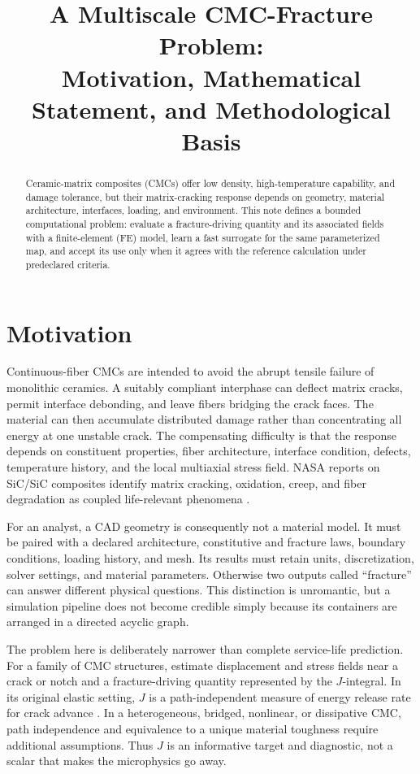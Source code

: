 \documentclass[11pt]{article}
\begin{document}
\title{A Multiscale CMC-Fracture Problem:\\Motivation, Mathematical Statement, and Methodological Basis}
\author{}
\date{}
\maketitle

\begin{abstract}
Ceramic-matrix composites (CMCs) offer low density, high-temperature capability,
and damage tolerance, but their matrix-cracking response depends on geometry,
material architecture, interfaces, loading, and environment. This note defines
a bounded computational problem: evaluate a fracture-driving quantity and its
associated fields with a finite-element (FE) model, learn a fast surrogate for
the same parameterized map, and accept its use only when it agrees with the
reference calculation under predeclared criteria.
\end{abstract}

\section{Motivation}
Continuous-fiber CMCs are intended to avoid the abrupt tensile failure of
monolithic ceramics.  A suitably compliant interphase can deflect matrix cracks,
permit interface debonding, and leave fibers bridging the crack faces.  The
material can then accumulate distributed damage rather than concentrating all
energy at one unstable crack.  The compensating difficulty is that the response
depends on constituent properties, fiber architecture, interface condition,
defects, temperature history, and the local multiaxial stress field.  NASA
reports on SiC/SiC composites identify matrix cracking, oxidation, creep, and
fiber degradation as coupled life-relevant phenomena
\citep{nasacmcbehavior,nasasic1200}.

For an analyst, a CAD geometry is consequently not a material model.  It must be
paired with a declared architecture, constitutive and fracture laws, boundary
conditions, loading history, and mesh.  Its results must retain units,
discretization, solver settings, and material parameters.  Otherwise two outputs
called ``fracture'' can answer different physical questions.  This distinction is
unromantic, but a simulation pipeline does not become credible simply because its
containers are arranged in a directed acyclic graph.

The problem here is deliberately narrower than complete service-life prediction.
For a family of CMC structures, estimate displacement and stress fields near a
crack or notch and a fracture-driving quantity represented by the $J$-integral.
In its original elastic setting, $J$ is a path-independent measure of energy
release rate for crack advance \citep{rice1968}.  In a heterogeneous,
bridged, nonlinear, or dissipative CMC, path independence and equivalence to a
unique material toughness require additional assumptions.  Thus $J$ is an
informative target and diagnostic, not a scalar that makes the microphysics go
away.
\end{document}
